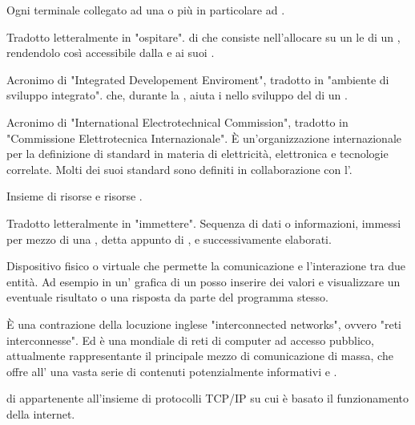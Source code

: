 {Ogni terminale collegato ad una  o più in particolare ad .}


{Tradotto letteralmente in "ospitare".  di  che consiste nell'allocare su un  le  di un , rendendolo così accessibile dalla   e ai suoi .}



{Acronimo di "Integrated Developement Enviroment", tradotto in "ambiente di sviluppo integrato".  che, durante la , aiuta i  nello sviluppo del  di un .}


{Acronimo di "International Electrotechnical Commission", tradotto in "Commissione Elettrotecnica Internazionale". \`{E} un'organizzazione internazionale per la definizione di standard in materia di elettricità, elettronica e tecnologie correlate. Molti dei suoi standard sono definiti in collaborazione con l'.}

{Insieme di risorse  e risorse .}


{Tradotto letteralmente in "immettere". Sequenza di dati o informazioni, immessi per mezzo di una , detta appunto di , e successivamente elaborati.}





{Dispositivo fisico o virtuale che permette la comunicazione e l'interazione tra due entità. Ad esempio in un' grafica di un  posso inserire dei valori  e visualizzare un eventuale risultato o una risposta da parte del programma stesso.}


{\`{E} una contrazione della locuzione inglese "interconnected networks", ovvero "reti interconnesse".
 Ed è una  mondiale di reti di computer ad accesso pubblico, attualmente rappresentante il principale mezzo di comunicazione di massa, che offre all' una vasta serie di contenuti potenzialmente informativi e .}


{ di  appartenente all'insieme di protocolli  TCP/IP su cui è basato il funzionamento della  internet.}



